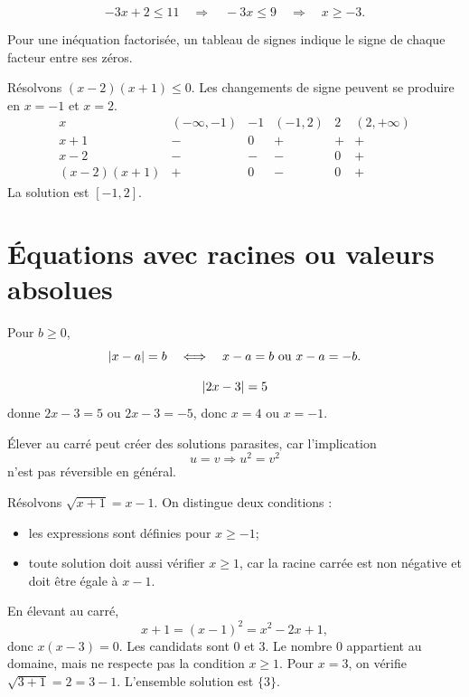 \begin{examplebox}
\[
-3x+2\le11
\quad\Longrightarrow\quad
-3x\le9
\quad\Longrightarrow\quad
x\ge-3.
\]
\end{examplebox}

Pour une inéquation factorisée, un tableau de signes indique le signe de chaque facteur entre ses zéros.

\begin{examplebox}
Résolvons $(x-2)(x+1)\le0$. Les changements de signe peuvent se produire en $x=-1$ et $x=2$.
\[
\begin{array}{c|ccccc}
x&(-\infty,-1)&-1&(-1,2)&2&(2,+\infty)\\ \hline
x+1&-&0&+&+&+\\
x-2&-&-&-&0&+\\ \hline
(x-2)(x+1)&+&0&-&0&+
\end{array}
\]
La solution est $[-1,2]$.
\end{examplebox}

\section{Équations avec racines ou valeurs absolues}
\label{manual:section:02.05}

Pour $b\ge0$,
\[
\left\lvert x-a\right\rvert=b\quad\Longleftrightarrow\quad x-a=b\ \text{ou}\ x-a=-b.
\]

\begin{examplebox}
\[
\left\lvert 2x-3\right\rvert=5
\]
donne $2x-3=5$ ou $2x-3=-5$, donc $x=4$ ou $x=-1$.
\end{examplebox}

Élever au carré peut créer des solutions parasites, car l'implication
\[
u=v\Longrightarrow u^2=v^2
\]
n'est pas réversible en général.

\begin{examplebox}
Résolvons $\sqrt{x+1}=x-1$. On distingue deux conditions :
\begin{itemize}
\item les expressions sont définies pour $x\ge-1$;
\item toute solution doit aussi vérifier $x\ge1$, car la racine carrée est non négative et doit être égale à $x-1$.
\end{itemize}
En élevant au carré,
\[
x+1=(x-1)^2=x^2-2x+1,
\]
donc $x(x-3)=0$. Les candidats sont $0$ et $3$. Le nombre $0$ appartient au domaine, mais ne respecte pas la condition $x\ge1$. Pour $x=3$, on vérifie $\sqrt{3+1}=2=3-1$. L'ensemble solution est $\{3\}$.
\end{examplebox}


